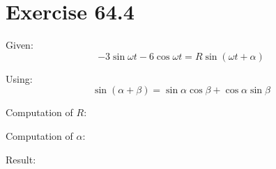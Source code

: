 \documentclass[a4paper, 10pt]{scrartcl}
\begin{document}
\section{Exercise 64.4}

Given:
\[-3\sin{\omega t} - 6\cos{\omega t} = R\sin{(\omega t + \alpha)}\]

Using:
\[\sin{(\alpha + \beta)} = \sin{\alpha}\cos{\beta} + \cos{\alpha}\sin{\beta}\]

Computation of $R$:

Computation of $\alpha$:

Result:
\end{document}

